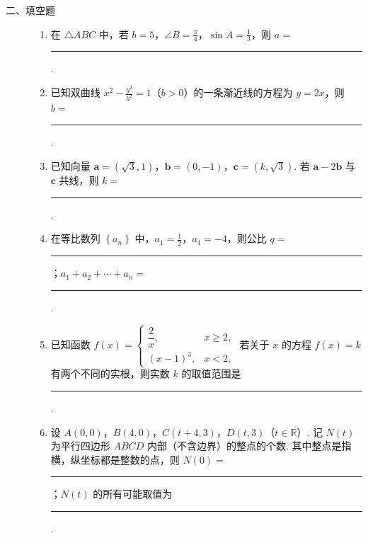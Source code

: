 \begin{description}

    \item[二、填空题]

    \begin{enumerate}[leftmargin=5pt]

      \addtocounter{enumi}{+8}

        \item 在 \(\triangle ABC\) 中，若 \(b = 5\)，\(\angle B = \frac{\pi}{4}\)，\(\sin A = \frac{1}{3}\)，则 \(a =\)\rule[-0.3ex]{3em}{0.4pt}.

        \item 已知双曲线 \(x^{2}-\frac{y^{2}}{b^{2}}=1\)（\(b>0\)）的一条渐近线的方程为 \(y = 2x\)，则 \(b=\)\rule[-0.3ex]{3em}{0.4pt}.

        \item 已知向量 \(\bm{a} = (\sqrt{3}, 1)\)，\(\bm{b} = (0, -1)\)，\(\bm{c} = (k, \sqrt{3})\). 若 \(\bm{a} - 2\bm{b}\) 与 \(\bm{c}\) 共线，则 \(k =\)\rule[-0.3ex]{3em}{0.4pt}.

        \item 在等比数列 \(\left\{a_{n}\right\}\) 中，\(a_{1}=\frac{1}{2}\)，\(a_{4}=-4\)，则公比 \(q=\)\rule[-0.3ex]{3em}{0.4pt}；\(a_{1}+a_{2}+\cdots+a_{n}=\)\rule[-0.3ex]{3em}{0.4pt}.

        \item 已知函数 \(f(x) = \begin{cases}
\dfrac{2}{x}, & x \geqslant 2,\\
(x - 1)^3, & x < 2,
\end{cases}\)
若关于 \(x\) 的方程 \(f(x) = k\) 有两个不同的实根，则实数 \(k\) 的取值范围是\rule[-0.3ex]{3em}{0.4pt}.

        \item 设 \(A(0,0)\)，\(B(4,0)\)，\(C(t + 4,3)\)，\(D(t,3) \)（\(t \in \mathbb{R}\)）. 记 \(N(t)\) 为平行四边形 \(ABCD\) 内部（不含边界）的整点的个数. 其中整点是指横，纵坐标都是整数的点，则 \(N(0) =\)\rule[-0.3ex]{3em}{0.4pt}；\(N(t)\) 的所有可能取值为\rule[-0.3ex]{3em}{0.4pt}.

    \end{enumerate}

\end{description}


